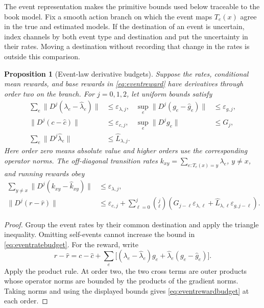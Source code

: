 \documentclass[11pt]{article}
\theoremstyle{plain}
\newtheorem{proposition}[theorem]{Proposition}
\theoremstyle{definition}
\theoremstyle{remark}
\newcommand{\norm}[1]{\lVert#1\rVert}
\begin{document}
The event representation makes the primitive bounds used below traceable
to the book model. Fix a smooth action branch on which the event maps
\(T_e(x)\) agree in the true and estimated models. If the destination of
an event is uncertain, index channels by both event type and destination
and put the uncertainty in their rates. Moving a destination without
recording that change in the rates is outside this comparison.

\begin{proposition}[Event-law derivative budgets]
\label{prop:eventbudgets}
Suppose the rates, conditional mean rewards, and base rewards in
\eqref{eq:eventreward} have derivatives through order two on the branch.
For \(j=0,1,2\), let uniform bounds satisfy
\begin{align*}
 \sum_e\norm{D^j(\lambda_e-\widehat\lambda_e)}
 &\le\varepsilon_{\lambda,j},&
 \sup_e\norm{D^j(g_e-\widehat g_e)}
 &\le\varepsilon_{g,j},\\
 \norm{D^j(c-\widehat c)}&\le\varepsilon_{c,j},&
 \sup_e\norm{D^jg_e}&\le G_j,\\
 \sum_e\norm{D^j\widehat\lambda_e}
 &\le\widehat L_{\lambda,j}.&&
\end{align*}
Here order zero means absolute value and higher orders use the
corresponding operator norms. The off-diagonal transition rates
\(k_{xy}=\sum_{e:T_e(x)=y}\lambda_e\), \(y\ne x\), and running rewards obey
\begin{align}
 \sum_{y\ne x}\norm{D^j(k_{xy}-\widehat k_{xy})}
 &\le\varepsilon_{\lambda,j},\label{eq:eventratebudget}\\
 \norm{D^j(r-\widehat r)}
 &\le\varepsilon_{c,j}
 +\sum_{\ell=0}^{j}\binom{j}{\ell}
 \left(G_{j-\ell}\varepsilon_{\lambda,\ell}
 +\widehat L_{\lambda,\ell}\varepsilon_{g,j-\ell}\right).
 \label{eq:eventrewardbudget}
\end{align}
\end{proposition}
\begin{proof}
Group the event rates by their common destination and apply the triangle
inequality. Omitting self-events cannot increase the bound in
\eqref{eq:eventratebudget}. For the reward, write
\[
 r-\widehat r=c-\widehat c
 +\sum_e\big[(\lambda_e-\widehat\lambda_e)g_e
             +\widehat\lambda_e(g_e-\widehat g_e)\big].
\]
Apply the product rule. At order two, the two cross terms are outer
products whose operator norms are bounded by the products of the
gradient norms. Taking norms and using the displayed bounds gives
\eqref{eq:eventrewardbudget} at each order.
\end{proof}
\end{document}
